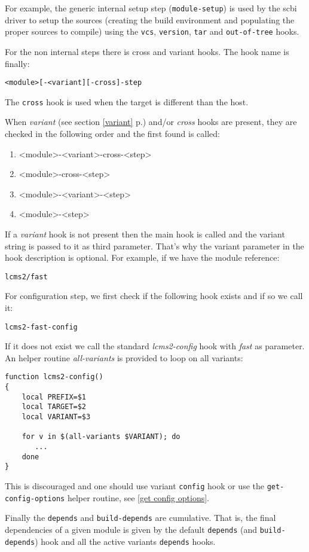 \documentclass[a4paper,12pt,twoside]{article}
\newcommand{\code}[1]{\texttt{#1}}
\renewcommand{\emph}[1]{\textit{#1}}
\newcommand{\seeref}[1]{see section \ref{#1} p.\pageref{#1}}
\begin{document}
For example, the generic internal setup step (\code{module-setup}) is used by the scbi driver to setup the sources (creating the build environment and populating the proper sources to compile) using the \code{vcs}, \code{version}, \code{tar} and \code{out-of-tree} hooks.

For the non internal steps there is cross and variant hooks. The hook name is finally:

\code{<module>[-<variant][-cross]-step}

The \code{cross} hook is used when the target is different than the host.

When \emph{variant} (\seeref{variant}) and/or \emph{cross} hooks are present, they are checked in the following order and the first found is called:

\begin{enumerate}
	\item <module>-<variant>-cross-<step>
	\item <module>-cross-<step>
	\item <module>-<variant>-<step>
	\item <module>-<step>
\end{enumerate}

If a \emph{variant} hook is not present then the main hook is called and the variant string is passed to it as third parameter. That's why the variant parameter in the hook description is optional.
For example, if we have the module reference:

\code{lcms2/fast}

For configuration step, we first check if the following hook exists and if so we call it:

\code{lcms2-fast-config}

If it does not exist we call the standard \emph{lcms2-config} hook with \emph{fast} as parameter. An helper routine \emph{all-variants} is provided to loop on all variants:

\begin{lstlisting}
function lcms2-config()
{
	local PREFIX=$1
	local TARGET=$2
	local VARIANT=$3

	for v in $(all-variants $VARIANT); do
	   ...
	done
}
\end{lstlisting}

This is discouraged and one should use variant \code{config} hook or use the \code{get-config-options} helper routine, see \ref{get config options}.

Finally the \code{depends} and \code{build-depends} are cumulative. That is, the final dependencies of a given module is given by the default \code{depends} (and \code{build-depends}) hook and all the active variants \code{depends} hooks.
\end{document}
